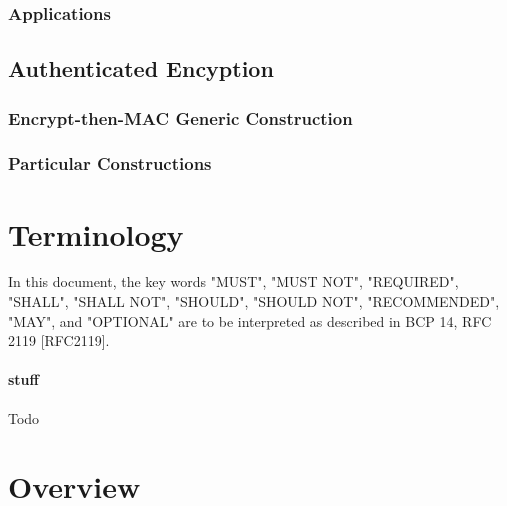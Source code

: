 \documentclass[10pt]{article}
\begin{document}
{{    \subsubsection{Applications}{
    }
  }
  \subsection{Authenticated Encyption}{
    \subsubsection{Encrypt-then-MAC Generic Construction}{
    }
    \subsubsection{Particular Constructions}{
    }
  }
}
\pagebreak

\section{Terminology}{
	In this document, the key words "MUST", "MUST NOT", "REQUIRED",
	"SHALL", "SHALL NOT", "SHOULD", "SHOULD NOT", "RECOMMENDED", "MAY",
	and "OPTIONAL" are to be interpreted as described in BCP 14, RFC 2119   [RFC2119].
	
	\paragraph{stuff} Todo
}
\pagebreak

\section{Overview}{
	\lipsum[4]
}
\end{document}
